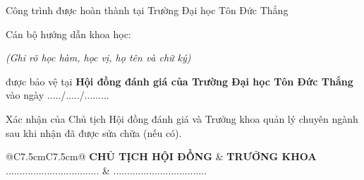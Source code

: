\clearpage
\noindent Công trình được hoàn thành tại Trường Đại học Tôn Đức Thắng

\noindent Cán bộ hướng dẫn khoa học: \gvhd

\noindent\dotfill

\begin{center}\textit{(Ghi rõ học hàm, học vị, họ tên và chữ ký)}\end{center}

\vspace{0.8cm}
\loaidoanthuong{} được bảo vệ tại \textbf{Hội đồng đánh giá \loaidoanthuong{} của Trường Đại học Tôn Đức Thắng} vào ngày ...../...../.........

Xác nhận của Chủ tịch Hội đồng đánh giá \loaidoanthuong{} và Trưởng khoa quản lý chuyên ngành sau khi nhận \loaidoanthuong{} đã được sửa chữa (nếu có).

\vspace{0.8cm}
\noindent\begin{tabular}{@{}C{7.5cm}C{7.5cm}@{}}
\textbf{CHỦ TỊCH HỘI ĐỒNG} & \textbf{TRƯỞNG KHOA}\\[2.5cm]
.................................. & ..................................
\end{tabular}
